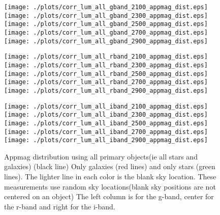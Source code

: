 \documentclass[10pt]{article}
\begin{document}
\begin{figure}
\centering
\begin{minipage}{0.32\textwidth}
 \texttt{[image: ./plots/corr\_lum\_all\_gband\_2100\_appmag\_dist.eps]}
 \texttt{[image: ./plots/corr\_lum\_all\_gband\_2300\_appmag\_dist.eps]}
 \texttt{[image: ./plots/corr\_lum\_all\_gband\_2500\_appmag\_dist.eps]}
 \texttt{[image: ./plots/corr\_lum\_all\_gband\_2700\_appmag\_dist.eps]}
 \texttt{[image: ./plots/corr\_lum\_all\_gband\_2900\_appmag\_dist.eps]}
\end{minipage}
 \begin{minipage}{0.32\textwidth}
 \texttt{[image: ./plots/corr\_lum\_all\_rband\_2100\_appmag\_dist.eps]}
 \texttt{[image: ./plots/corr\_lum\_all\_rband\_2300\_appmag\_dist.eps]}
 \texttt{[image: ./plots/corr\_lum\_all\_rband\_2500\_appmag\_dist.eps]}
 \texttt{[image: ./plots/corr\_lum\_all\_rband\_2700\_appmag\_dist.eps]}
 \texttt{[image: ./plots/corr\_lum\_all\_rband\_2900\_appmag\_dist.eps]}
\end{minipage}
\begin{minipage}{0.32\textwidth}
 \texttt{[image: ./plots/corr\_lum\_all\_iband\_2100\_appmag\_dist.eps]}
 \texttt{[image: ./plots/corr\_lum\_all\_iband\_2300\_appmag\_dist.eps]}
 \texttt{[image: ./plots/corr\_lum\_all\_iband\_2500\_appmag\_dist.eps]}
 \texttt{[image: ./plots/corr\_lum\_all\_iband\_2700\_appmag\_dist.eps]}
 \texttt{[image: ./plots/corr\_lum\_all\_iband\_2900\_appmag\_dist.eps]}
\end{minipage}
\caption{Appmag distribution using all primary objects(ie all stars and galaxies) (black line) 
Only galaxies (red lines) and only stars (green lines).
The lighter line in each color is the blank sky location.
These measurements use random sky locations(blank sky positions are not centered on an object)
The left column is for the g-band, center for the r-band and right for the i-band.
}
\end{figure}
\end{document}
